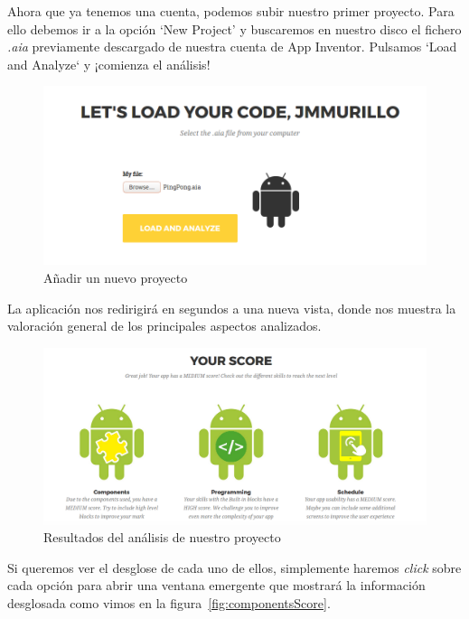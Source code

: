 \documentclass[a4paper, 12pt]{book}
\begin{document}
Ahora que ya tenemos una cuenta, podemos subir nuestro primer proyecto. Para ello debemos ir a la opción `New Project' y buscaremos en nuestro disco el fichero \textit{.aia} previamente descargado de nuestra cuenta de App Inventor. Pulsamos `Load and Analyze` y ¡comienza el análisis!
\begin{figure}[H]
  \centering
  \includegraphics[width=\linewidth, keepaspectratio]{img/addNewProject}
  \caption{Añadir un nuevo proyecto}
  \label{fig:addNewProject}
\end{figure}
La aplicación nos redirigirá en segundos a una nueva vista, donde nos muestra la valoración general de los principales aspectos analizados. 
\begin{figure}[H]
  \centering
  \includegraphics[width=\linewidth, keepaspectratio]{img/analysisResults}
  \caption{Resultados del análisis de nuestro proyecto}
  \label{fig:analysisResults}
\end{figure}
Si queremos ver el desglose de cada uno de ellos, simplemente haremos \textit{click} sobre cada opción para abrir una ventana emergente que mostrará la información desglosada como vimos en la figura~\ref{fig:componentsScore}.
\end{document}
